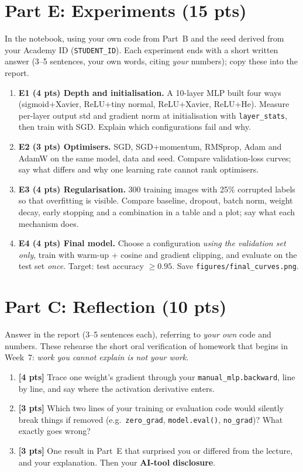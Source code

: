 \documentclass[11pt,a4paper]{article}
\begin{document}
\section{Part E: Experiments (15 pts)}
In the notebook, using your own code from Part~B and the seed derived from your Academy ID (\texttt{STUDENT\_ID}). Each experiment ends with a short written answer (3--5 sentences, your own words, citing \emph{your} numbers); copy these into the report.
\begin{enumerate}
  \item \textbf{E1 (4 pts) Depth and initialisation.} A 10-layer MLP built four ways (sigmoid+Xavier, ReLU+tiny normal, ReLU+Xavier, ReLU+He). Measure per-layer output std and gradient norm at initialisation with \texttt{layer\_stats}, then train with SGD. Explain which configurations fail and why.
  \item \textbf{E2 (3 pts) Optimisers.} SGD, SGD+momentum, RMSprop, Adam and AdamW on the same model, data and seed. Compare validation-loss curves; say what differs and why one learning rate cannot rank optimisers.
  \item \textbf{E3 (4 pts) Regularisation.} 300 training images with 25\% corrupted labels so that overfitting is visible. Compare baseline, dropout, batch norm, weight decay, early stopping and a combination in a table and a plot; say what each mechanism does.
  \item \textbf{E4 (4 pts) Final model.} Choose a configuration \emph{using the validation set only}, train with warm-up + cosine and gradient clipping, and evaluate on the test set \emph{once}. Target: test accuracy $\ge0.95$. Save \texttt{figures/final\_curves.png}.
\end{enumerate}

\section{Part C: Reflection (10 pts)}
Answer in the report (3--5 sentences each), referring to \emph{your own} code and numbers. These rehearse the short oral verification of homework that begins in Week~7: \emph{work you cannot explain is not your work.}
\begin{enumerate}
  \item \textbf{[4 pts]} Trace one weight's gradient through your \texttt{manual\_mlp.backward}, line by line, and say where the activation derivative enters.
  \item \textbf{[3 pts]} Which two lines of your training or evaluation code would silently break things if removed (e.g.\ \texttt{zero\_grad}, \texttt{model.eval()}, \texttt{no\_grad})? What exactly goes wrong?
  \item \textbf{[3 pts]} One result in Part~E that surprised you or differed from the lecture, and your explanation. Then your \textbf{AI-tool disclosure}.
\end{enumerate}
\end{document}
